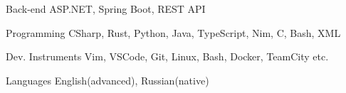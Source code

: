 

\begin{cvskills}
  \cvskill
    {Back-end} %
    {ASP.NET, Spring Boot, REST API} %

  \cvskill
    {Programming} %
    {CSharp, Rust, Python, Java, TypeScript, Nim, C, Bash, XML} %

  \cvskill
    {Dev. Instruments} %
    {Vim, VSCode, Git, Linux, Bash, Docker, TeamCity etc.} %

  \cvskill
  {Languages} %
  {English(advanced), Russian(native)} %

\end{cvskills}
